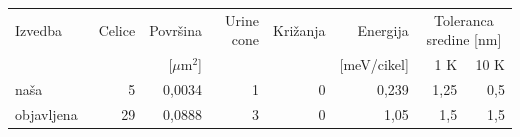 \begin{tabular}{lrrrrrrr}
\toprule
Izvedba & Celice & Površina & Urine cone & Križanja & Energija & \multicolumn{2}{c}{Toleranca sredine [nm]} \\
 & & [$\mu$m$^2$] & & & [meV/cikel] & 1 K & 10 K \\
\midrule
naša & 5 & 0{,}0034 & 1 & 0 & 0{,}239 & 1{,}25 & 0{,}5 \\
objavljena~\cite{g12:silltorres2018} & 29 & 0{,}0888 & 3 & 0 & 1{,}05 & 1{,}5 & 1{,}5 \\
\bottomrule
\end{tabular}
